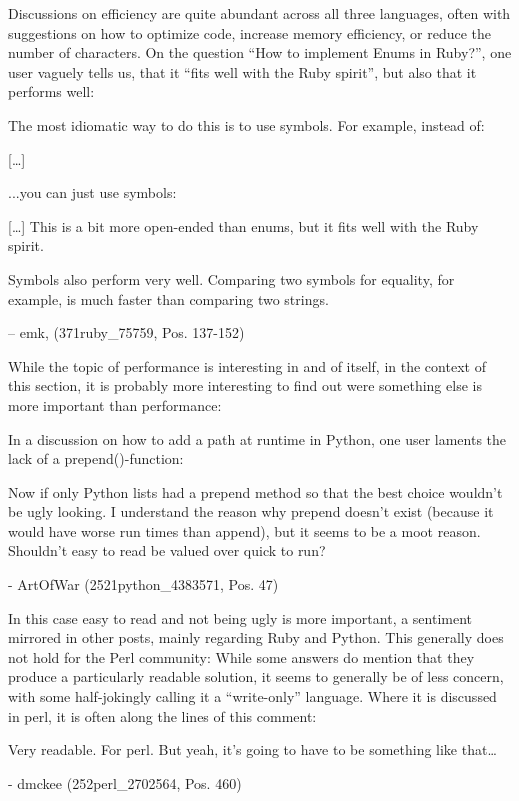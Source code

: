 Discussions on efficiency are quite abundant across all three languages, often with suggestions on how to optimize code,
increase memory efficiency, or reduce the number of characters. On the question “How to implement Enums in Ruby?”,
one user vaguely tells us, that it “fits well with the Ruby spirit”, but also that it performs well:

\begin{displayquote}
    The most idiomatic way to do this is to use symbols. For example, instead of:

    [\ldots]

    ...you can just use symbols:

    [\ldots]
    This is a bit more open-ended than enums, but it fits well with the Ruby spirit.

    Symbols also perform very well. Comparing two symbols for equality, for example, is much faster than comparing two strings.

    – emk,  (371ruby\_75759, Pos. 137-152)
\end{displayquote}

While the topic of performance is interesting in and of itself, in the context of this section, it is probably more
interesting to find out were something else is more important than performance:

In a discussion on how to add a path at runtime in Python, one user laments the lack of a prepend()-function:

\begin{displayquote}
    Now if only Python lists had a prepend method so that the best choice wouldn't be ugly looking. I understand the
    reason why prepend doesn't exist (because it would have worse run times than append), but it seems to be a moot reason.
    Shouldn't easy to read be valued over quick to run?

    - ArtOfWar (2521python\_4383571, Pos. 47)
\end{displayquote}

In this case easy to read and not being ugly is more important, a sentiment mirrored in other posts, mainly regarding
Ruby and Python. This generally does not hold for the Perl community: While some answers do mention that they produce a
particularly readable solution, it seems to generally be of less concern, with some half-jokingly calling it a “write-only”
language. Where it is discussed in perl, it is often along the lines of this comment:

\begin{displayquote}
    Very readable. For perl. But yeah, it's going to have to be something like that…

    - dmckee (252perl\_2702564, Pos. 460)
\end{displayquote}

